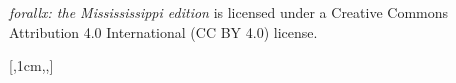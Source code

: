 \documentclass[bleedwidth=3.17mm, marklength=0mm, coverheight=228.6mm, coverwidth=152.4mm, spinewidth=13.82mm]{bookcover} %
\begin{document}
\begin{bookcover}
{\quad \textit{forallx: the Missississippi edition} is licensed under a Creative Commons Attribution 4.0 International (CC BY 4.0) license.  
}


[,1cm,,]{
\vfill
\centering\textcolor{forallx-orange}{
\colorbox{white}{%
}}}


\end{bookcover}
\end{document}
